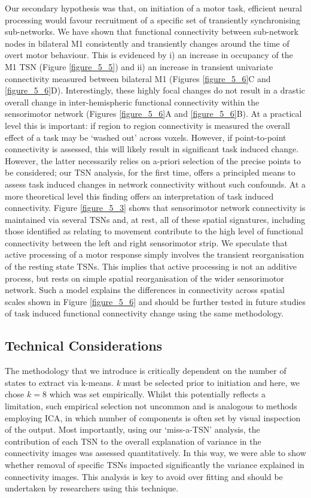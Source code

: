 Our secondary hypothesis was that, on initiation of a motor task, efficient neural processing would favour recruitment of a specific set of transiently synchronising sub-networks. We have shown that functional connectivity between sub-network nodes in bilateral M1 consistently and transiently changes around the time of overt motor behaviour. This is evidenced by i) an increase in occupancy of the M1 TSN (Figure \ref{figure_5_5}) and ii) an increase in transient univariate connectivity measured between bilateral M1 (Figures \ref{figure_5_6}C and \ref{figure_5_6}D). Interestingly, these highly focal changes do not result in a drastic overall change in inter-hemispheric functional connectivity within the sensorimotor network (Figures \ref{figure_5_6}A and \ref{figure_5_6}B). At a practical level this is important: if region to region connectivity is measured the overall effect of a task may be ‘washed out’ across voxels. However, if point-to-point connectivity is assessed, this will likely result in significant task induced change. However, the latter necessarily relies on a-priori selection of the precise points to be considered; our TSN analysis, for the first time, offers a principled means to assess task induced changes in network connectivity without such confounds. At a more theoretical level this finding offers an interpretation of task induced connectivity. Figure \ref{figure_5_3} shows that sensorimotor network connectivity is maintained via several TSNs and, at rest, all of these spatial signatures, including those identified as relating to movement contribute to the high level of functional connectivity between the left and right sensorimotor strip. We speculate that active processing of a motor response simply involves the transient reorganisation of the resting state TSNs. This implies that active processing is not an additive process, but rests on simple spatial reorganisation of the wider sensorimotor network. Such a model explains the differences in connectivity across spatial scales shown in Figure \ref{figure_5_6} and should be further tested in future studies of task induced functional connectivity change using the same methodology.

\subsection{Technical Considerations}
The methodology that we introduce is critically dependent on the number of states to extract via k-means. \textit{k} must be selected prior to initiation and here, we chose $k=8$ which was set empirically. Whilst this potentially reflects a limitation, such empirical selection not uncommon and is analogous to methods employing ICA, in which number of components is often set by visual inspection of the output. Most importantly, using our ‘miss-a-TSN’ analysis, the contribution of each TSN to the overall explanation of variance in the connectivity images was assessed quantitatively. In this way, we were able to show whether removal of specific TSNs impacted significantly the variance explained in connectivity images. This analysis is key to avoid over fitting and should be undertaken by researchers using this technique.

